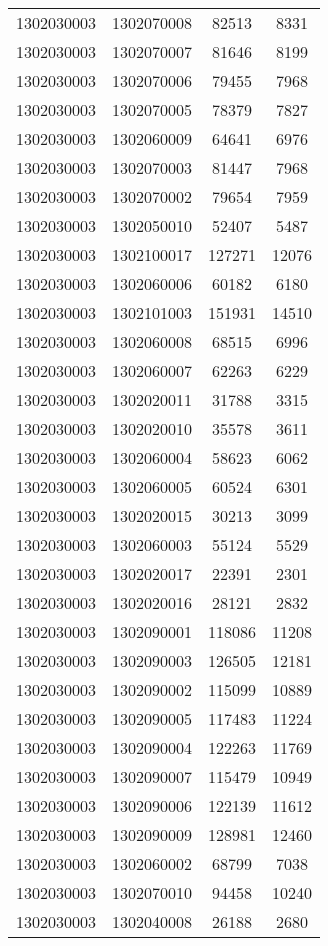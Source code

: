 \begin{longtable}{llcc}
1302030003 & 1302070008 & 82513 & 8331\\
1302030003 & 1302070007 & 81646 & 8199\\
1302030003 & 1302070006 & 79455 & 7968\\
1302030003 & 1302070005 & 78379 & 7827\\
1302030003 & 1302060009 & 64641 & 6976\\
1302030003 & 1302070003 & 81447 & 7968\\
1302030003 & 1302070002 & 79654 & 7959\\
1302030003 & 1302050010 & 52407 & 5487\\
1302030003 & 1302100017 & 127271 & 12076\\
1302030003 & 1302060006 & 60182 & 6180\\
1302030003 & 1302101003 & 151931 & 14510\\
1302030003 & 1302060008 & 68515 & 6996\\
1302030003 & 1302060007 & 62263 & 6229\\
1302030003 & 1302020011 & 31788 & 3315\\
1302030003 & 1302020010 & 35578 & 3611\\
1302030003 & 1302060004 & 58623 & 6062\\
1302030003 & 1302060005 & 60524 & 6301\\
1302030003 & 1302020015 & 30213 & 3099\\
1302030003 & 1302060003 & 55124 & 5529\\
1302030003 & 1302020017 & 22391 & 2301\\
1302030003 & 1302020016 & 28121 & 2832\\
1302030003 & 1302090001 & 118086 & 11208\\
1302030003 & 1302090003 & 126505 & 12181\\
1302030003 & 1302090002 & 115099 & 10889\\
1302030003 & 1302090005 & 117483 & 11224\\
1302030003 & 1302090004 & 122263 & 11769\\
1302030003 & 1302090007 & 115479 & 10949\\
1302030003 & 1302090006 & 122139 & 11612\\
1302030003 & 1302090009 & 128981 & 12460\\
1302030003 & 1302060002 & 68799 & 7038\\
1302030003 & 1302070010 & 94458 & 10240\\
1302030003 & 1302040008 & 26188 & 2680\\

\end{longtable}

